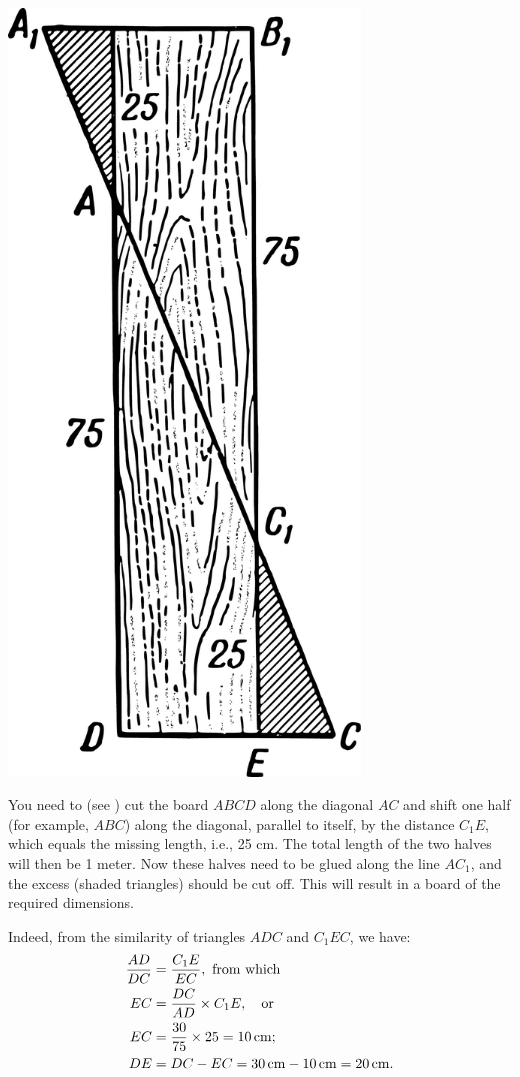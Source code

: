 \begin{marginfigure}%
\centering
\includegraphics[width=0.7\textwidth]{figures/ch-12/fig-190.pdf}
\end{marginfigure}
You need to (see ) cut the board $ABCD$ along the diagonal $AC$ and shift one half (for example, $ABC$) along the diagonal, parallel to itself, by the distance $C_{1}E$, which equals the missing length, i.e., 25 cm. The total length of the two halves will then be 1 meter. Now these halves need to be glued along the line $AC_{1}$, and the excess (shaded triangles) should be cut off. This will result in a board of the required dimensions.

Indeed, from the similarity of triangles $ADC$ and $C_{1}EC$, we have:
\begin{alignat*}{1}%
\frac{AD}{DC} & = \frac{C_{1}E}{EC},\, \, \text{from which}\\
EC & = \frac{DC}{AD} \times C_{1}E, \qor \\
EC & = \frac{30}{75} \times 25 = \SI{10}{\centi\meter};\\
DE & = DC - EC =  \SI{30}{\centi\meter} -  \SI{10}{\centi\meter} =  \SI{20}{\centi\meter}.
\end{alignat*}


